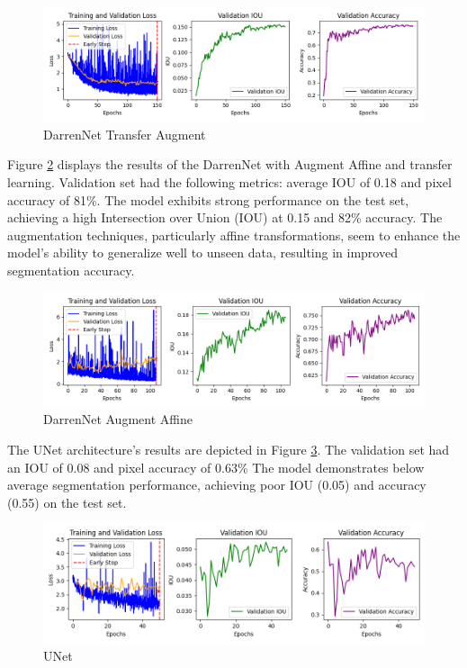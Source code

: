 \begin{figure}[H]
	\centering
	\includegraphics[width=\textwidth]{plots/darrennet_transfer_augment}
	\caption{DarrenNet Transfer Augment}
	\label{fig:darren_transfer_aug}
\end{figure}

Figure \ref{fig:darren_aug_aff} displays the results of the DarrenNet with Augment Affine and transfer learning. Validation set had the following metrics: average IOU of 0.18 and pixel accuracy of 81\%. The model exhibits strong performance on the test set, achieving a high Intersection over Union (IOU) at 0.15 and 82\% accuracy. The augmentation techniques, particularly affine transformations, seem to enhance the model's ability to generalize well to unseen data, resulting in improved segmentation accuracy.

\begin{figure}[H]
	\centering
	\includegraphics[width=\textwidth]{plots/darrennet_augment_affine}
	\caption{DarrenNet Augment Affine}
	\label{fig:darren_aug_aff}
\end{figure}


The UNet architecture's results are depicted in Figure \ref{fig:unet}. The validation set had an IOU of 0.08 and pixel accuracy of 0.63\% The model demonstrates below average segmentation performance, achieving poor IOU (0.05) and accuracy (0.55) on the test set.

\begin{figure}[H]
	\centering
	\includegraphics[width=\textwidth]{plots/unet}
	\caption{UNet}
	\label{fig:unet}
\end{figure}

